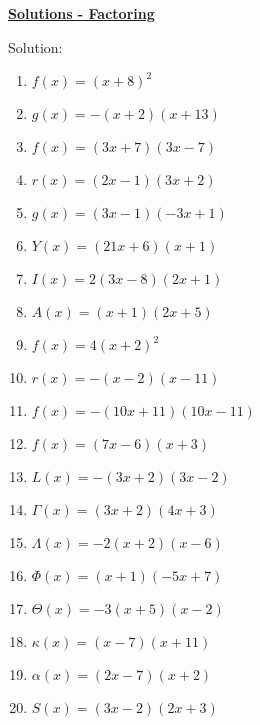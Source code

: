 \documentclass[12pt]{article} %
\begin{document}
\begin{center}
  \textbf{\underline{\Huge{Solutions - Factoring}}}
\end{center}
\begin{qstn} Solution:  
    \begin{enumerate}
      \item $f(x) = (x + 8)^2$
      \item $g(x) = -(x+2)(x + 13)$
      \item $f(x) = (3x + 7)(3x- 7)$
      \item $r(x) = (2x-1)(3x+2)$
      \item $g(x) = (3x-1)(-3x+1)$ 
      \item $Y(x) = (21x + 6)(x + 1)$
      \item $I(x) = 2(3x - 8)(2x + 1)$ 
      \item $A(x) = (x+1)(2x+5)$
      \item $f(x) = 4(x + 2)^2$
      \item $r(x) = -(x-2)(x-11)$
      \item $f(x) = -(10x + 11)(10x - 11)$ 
      \item $f(x) = (7x-6)(x+3)$
      \item $L(x) = -(3x + 2)(3x - 2)$ 
      \item $\Gamma(x) = (3x + 2)(4x + 3)$ 
      \item $\Lambda(x) = -2(x+2)(x-6)$
      \item $\Phi(x) = (x+1)(-5x+7)$
      \item $\Theta(x) = -3(x+5)(x-2)$
      \item $\kappa(x) = (x-7)(x+11)$
      \item  $\alpha(x) = (2x - 7)(x+2)$
      \item  $S(x) = (3x-2)(2x+3)$
    \end{enumerate}
\end{qstn}
\end{document}
